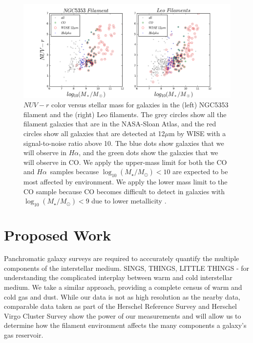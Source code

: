 \documentclass[11pt, preprint]{aastex}
\newcommand{\ha}{$H\alpha$}
\begin{document}
\begin{figure}[h]
\includegraphics[width=\textwidth]{sample.png}
\caption{\small $NUV-r$ color versus stellar mass for galaxies 
  in the (left) NGC5353 filament and the (right) Leo filaments.
The grey circles show all the filament galaxies that are in the
NASA-Sloan Atlas, and the red circles show all galaxies that are
detected at 12$\mu$m by WISE with a signal-to-noise ratio above 10.
The blue dots show galaxies that we will observe in \ha, and the green
dots show the galaxies that we will observe in CO.  We apply the upper-mass
limit for both the CO and \ha \ samples because
$\log_{10}(M_\star/M_\odot) < 10$ are expected to be most affected by
environment.  We apply the lower mass limit to the CO sample because
CO becomes difficult to detect in galaxies with
$\log_{10}(M_\star/M_\odot) < 9$ due to lower metallicity \citep[e.g.][]{cormier14}.}
\label{sample}
\end{figure}


\vspace*{-.8cm}\section{Proposed Work} 
\vspace*{-.2cm}
Panchromatic galaxy surveys are required to acccurately quantify the multiple
components of the interstellar medium.
SINGS, THINGS, LITTLE THINGS - for understanding the complicated
interplay between warm and cold interstellar medium.  We take a
similar approach, providing a complete census of warm and cold gas and
dust.  While our data is not as high resolution as the nearby data,
comparable data taken as part of the Herschel Reference Survey
\citep{Ciesla12} and Herschel Virgo Cluster Survey \citep{davies10}
show the power of our measurements and will allow us to determine how
the filament environment affects the many components a galaxy's gas
reservoir.
\end{document}
